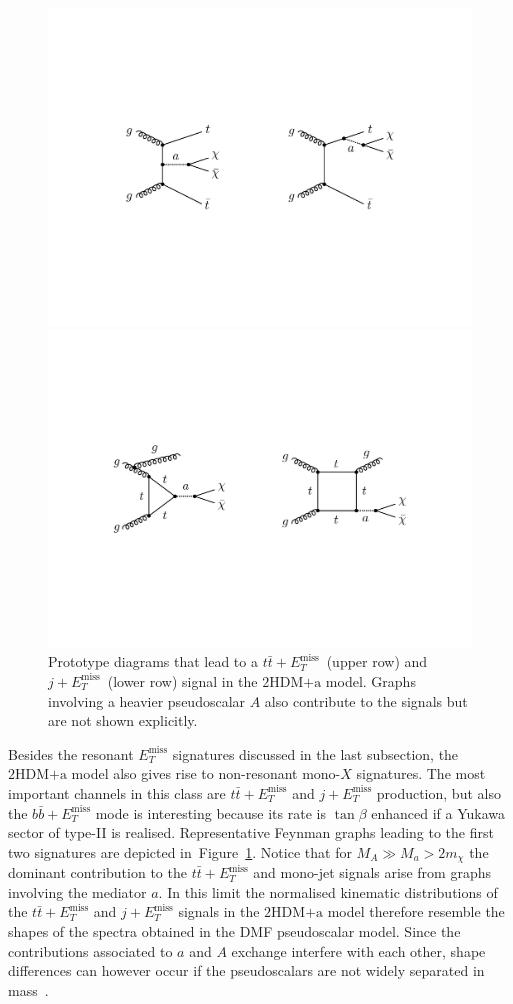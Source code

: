 \documentclass[a4paper, 11pt,notoc]{article}
\newcommand{\MET}{\ensuremath{E_T^\mathrm{miss}}\xspace}
\newcommand{\hdma}{\ensuremath{\textrm{2HDM+a}}\xspace}
\begin{document}
\begin{figure}[t!]
\centering
\includegraphics[width=.725\textwidth]{ttmet.pdf}

\vspace{7mm}

\includegraphics[width=.8\textwidth]{jmet.pdf}

\vspace{4mm}
\caption{\label{fig:nonresonant} Prototype diagrams that lead  to a $t \bar t+\MET$~(upper row) and $j+\MET$~(lower row) signal in the \hdma model. Graphs involving a heavier pseudoscalar $A$ also contribute to the signals but are not shown explicitly.}
\end{figure}

Besides the resonant $\MET$ signatures discussed in the last subsection, the   \hdma model also gives rise to non-resonant mono-$X$ signatures. The most important channels in this class are $t \bar t +\MET$ and $j+\MET$ production, but also  the $b \bar b +\MET$ mode is interesting  because its rate is $\tan \beta$ enhanced if a Yukawa sector of  type-II is realised.  Representative Feynman graphs leading to the first two signatures are depicted in~Figure~\ref{fig:nonresonant}. Notice that for $M_A \gg M_a > 2 m_\chi$ the dominant contribution to the  $t \bar t +\MET$ and mono-jet signals arise from graphs involving the  mediator $a$. In this limit the normalised kinematic distributions of the $t \bar t + \MET$ and $j+\MET$ signals in the \hdma model therefore resemble the shapes of the spectra obtained in the DMF pseudoscalar   model. Since the contributions  associated to $a$ and $A$ exchange interfere with each other, shape differences can however occur if the pseudoscalars are not widely separated in mass~\cite{Bauer:2017ota}.
\end{document}
